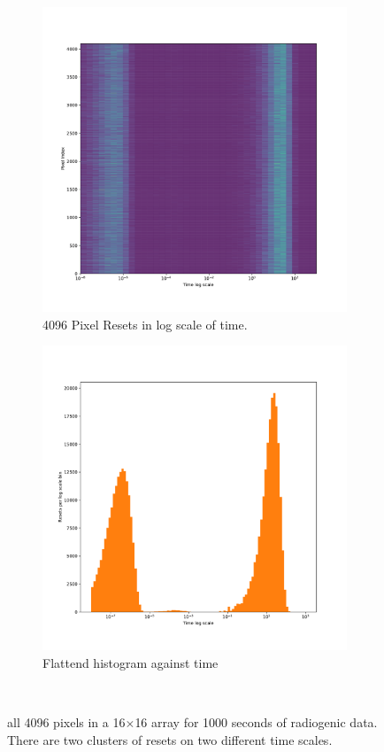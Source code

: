 \begin{figure}
\centering
\begin{subfigure}{.5\textwidth}
  \centering
  \includegraphics[width=\textwidth]{images/radiogenicRTDtimescale.pdf}
  \caption{4096 Pixel Resets in log scale of time.}
\end{subfigure}%
\begin{subfigure}{.5\textwidth}
  \centering
  \includegraphics[width=\textwidth]{images/radiogenicRTDtimescale_1d.pdf}
  \caption{Flattend histogram against time}
\end{subfigure}
\caption{all 4096 pixels in a 16$\times$16 array for 1000 seconds of radiogenic data. 
There are two clusters of resets on two different time scales.}
~\label{fig:radiogenic_rtd_timescales}
\end{figure}


